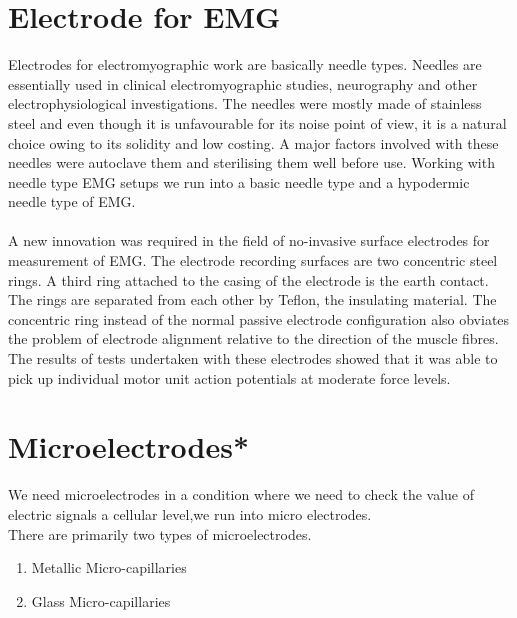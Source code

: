 \documentclass{article}
\begin{document}
\section{Electrode for EMG}
Electrodes for electromyographic work are basically needle types. Needles are essentially used in clinical electromyographic studies, neurography and other electrophysiological investigations. The needles were mostly made of stainless steel and even though it is unfavourable for its noise point of view, it is a natural choice owing to its solidity and low costing. A major factors involved with these needles were autoclave them and sterilising them well before use. Working with needle type EMG setups we run into a basic needle type and a hypodermic needle type of EMG. \\
\\
A new innovation was required in the field of no-invasive surface electrodes for measurement of EMG. The electrode recording surfaces are two concentric steel rings. A third ring attached to the casing of the electrode is the earth contact. The rings are separated from each other by Teflon, the insulating material. The concentric ring instead of the normal passive electrode configuration also obviates the problem of electrode alignment relative to the direction of the muscle fibres. The results of tests undertaken with these electrodes showed that it was able to pick up
individual motor unit action potentials at moderate force levels.
\section{Microelectrodes*}
We need microelectrodes in a condition where we need to check the value of electric signals a cellular level,we run into micro electrodes.\\
There are primarily two types of microelectrodes.
\begin{enumerate}
    \item Metallic Micro-capillaries
    \item Glass Micro-capillaries
\end{enumerate}
\end{document}
